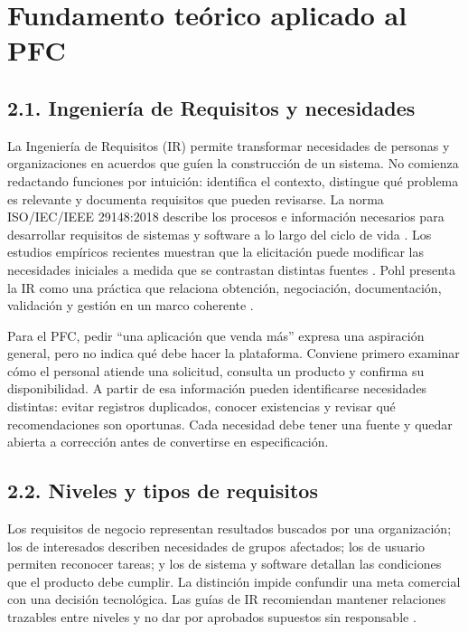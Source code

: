 \section{Fundamento te\'orico aplicado al PFC}
\subsection{2.1. Ingenier\'ia de Requisitos y necesidades}
La Ingenier\'ia de Requisitos (IR) permite transformar necesidades de personas y organizaciones en acuerdos que gu\'ien la construcci\'on de un sistema. No comienza redactando funciones por intuici\'on: identifica el contexto, distingue qu\'e problema es relevante y documenta requisitos que pueden revisarse. La norma ISO/IEC/IEEE 29148:2018 describe los procesos e informaci\'on necesarios para desarrollar requisitos de sistemas y software a lo largo del ciclo de vida \cite{iso29148}. Los estudios empíricos recientes muestran que la elicitación puede modificar las necesidades iniciales a medida que se contrastan distintas fuentes \cite{ferrari2022}. Pohl presenta la IR como una pr\'actica que relaciona obtenci\'on, negociaci\'on, documentaci\'on, validaci\'on y gesti\'on en un marco coherente \cite{pohl2025}.

Para el PFC, pedir ``una aplicaci\'on que venda m\'as'' expresa una aspiraci\'on general, pero no indica qu\'e debe hacer la plataforma. Conviene primero examinar c\'omo el personal atiende una solicitud, consulta un producto y confirma su disponibilidad. A partir de esa informaci\'on pueden identificarse necesidades distintas: evitar registros duplicados, conocer existencias y revisar qu\'e recomendaciones son oportunas. Cada necesidad debe tener una fuente y quedar abierta a correcci\'on antes de convertirse en especificaci\'on.

\subsection{2.2. Niveles y tipos de requisitos}
Los requisitos de negocio representan resultados buscados por una organizaci\'on; los de interesados describen necesidades de grupos afectados; los de usuario permiten reconocer tareas; y los de sistema y software detallan las condiciones que el producto debe cumplir. La distinci\'on impide confundir una meta comercial con una decisi\'on tecnol\'ogica. Las gu\'ias de IR recomiendan mantener relaciones trazables entre niveles y no dar por aprobados supuestos sin responsable \cite{iso29148,swebok2024}.

